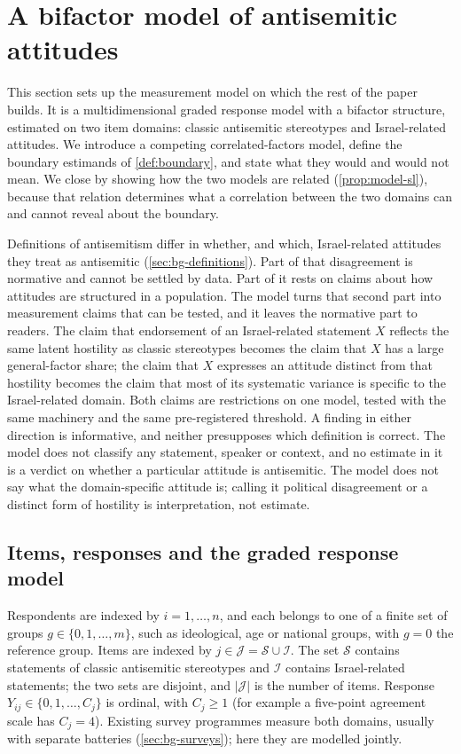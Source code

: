\section{A bifactor model of antisemitic attitudes}\label{sec:model}

This section sets up the measurement model on which the rest of the paper builds. It is a multidimensional graded response model with a bifactor structure, estimated on two item domains: classic antisemitic stereotypes and Israel-related attitudes. We introduce a competing correlated-factors model, define the boundary estimands of \cref{def:boundary}, and state what they would and would not mean. We close by showing how the two models are related (\cref{prop:model-sl}), because that relation determines what a correlation between the two domains can and cannot reveal about the boundary.

Definitions of antisemitism differ in whether, and which, Israel-related attitudes they treat as antisemitic (\cref{sec:bg-definitions}). Part of that disagreement is normative and cannot be settled by data. Part of it rests on claims about how attitudes are structured in a population. The model turns that second part into measurement claims that can be tested, and it leaves the normative part to readers. The claim that endorsement of an Israel-related statement $X$ reflects the same latent hostility as classic stereotypes becomes the claim that $X$ has a large general-factor share; the claim that $X$ expresses an attitude distinct from that hostility becomes the claim that most of its systematic variance is specific to the Israel-related domain. Both claims are restrictions on one model, tested with the same machinery and the same pre-registered threshold. A finding in either direction is informative, and neither presupposes which definition is correct. The model does not classify any statement, speaker or context, and no estimate in it is a verdict on whether a particular attitude is antisemitic. The model does not say what the domain-specific attitude is; calling it political disagreement or a distinct form of hostility is interpretation, not estimate.

\subsection{Items, responses and the graded response model}\label{sec:model-grm}

Respondents are indexed by $i=1,\dots,n$, and each belongs to one of a finite set of groups $g\in\{0,1,\dots,m\}$, such as ideological, age or national groups, with $g=0$ the reference group. Items are indexed by $j\in\mathcal J=\mathcal S\cup\mathcal I$. The set $\mathcal S$ contains statements of classic antisemitic stereotypes and $\mathcal I$ contains Israel-related statements; the two sets are disjoint, and $|\mathcal J|$ is the number of items. Response $Y_{ij}\in\{0,1,\dots,C_j\}$ is ordinal, with $C_j\ge1$ (for example a five-point agreement scale has $C_j=4$). Existing survey programmes measure both domains, usually with separate batteries (\cref{sec:bg-surveys}); here they are modelled jointly.

